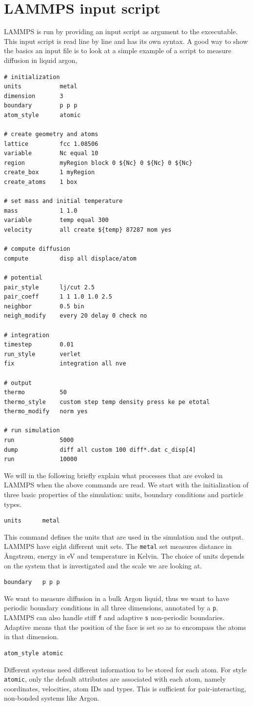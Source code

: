 \documentclass[twoside,english]{uiofysmaster}
\begin{document}
\section{LAMMPS input script}
LAMMPS is run by providing an input script as 
argument to the excecutable. This input script
is read line by line and has its own syntax. 
A good way to show the basics an input file
is to look at a simple example of a script
to measure diffusion in liquid argon,
\begin{lstlisting}[style=lammps]
# initialization
units 			metal		
dimension 		3
boundary		p p p		
atom_style		atomic		

# create geometry and atoms
lattice 		fcc 1.08506
variable		Nc equal 10
region 			myRegion block 0 ${Nc} 0 ${Nc} 0 ${Nc}
create_box		1 myRegion
create_atoms	1 box

# set mass and initial temperature
mass			1 1.0
variable		temp equal 300
velocity		all create ${temp} 87287 mom yes 

# compute diffusion
compute 		disp all displace/atom

# potential 
pair_style		lj/cut 2.5
pair_coeff		1 1 1.0 1.0 2.5
neighbor		0.5 bin
neigh_modify	every 20 delay 0 check no

# integration
timestep 		0.01
run_style 		verlet
fix 			integration all nve

# output
thermo			50
thermo_style 	custom step temp density press ke pe etotal 
thermo_modify 	norm yes

# run simulation
run				5000
dump 			diff all custom 100 diff*.dat c_disp[4]
run				10000
\end{lstlisting}
We will in the following briefly explain what
processes that are evoked in LAMMPS when the 
above commands are read. We start with the initialization of 
three basic properties of the simulation: units, boundary conditions and particle types.
\begin{lstlisting}[style=lammps]
 units 		metal
\end{lstlisting}
This command defines the units that are used 
in the simulation and the output. LAMMPS have eight
different unit sets. The \texttt{metal} set measures
distance in \AA{}ngstr\o{}m, energy in eV and temperature
in Kelvin. The choice of units depends on the system
that is investigated and the scale we are looking at.
\begin{lstlisting}[style=lammps]
 boundary 	p p p
\end{lstlisting}
We want to measure diffusion in a bulk
Argon liquid, thus we want to have periodic 
boundary conditions in all three dimensions, 
annotated by a \texttt{p}. LAMMPS can also handle stiff \texttt{f}
and adaptive \texttt{s} non-periodic boundaries. Adaptive
means that the position of the face is set so as to
encompass the atoms in that dimension. 
\begin{lstlisting}[style=lammps]
 atom_style atomic
\end{lstlisting}
Different systems need different information
to be stored for each atom. For style \texttt{atomic}, only
the default attributes are associated with each atom, 
namely coordinates, velocities, atom IDs and types. 
This is sufficient for pair-interacting, non-bonded
systems like Argon.
\end{document}
